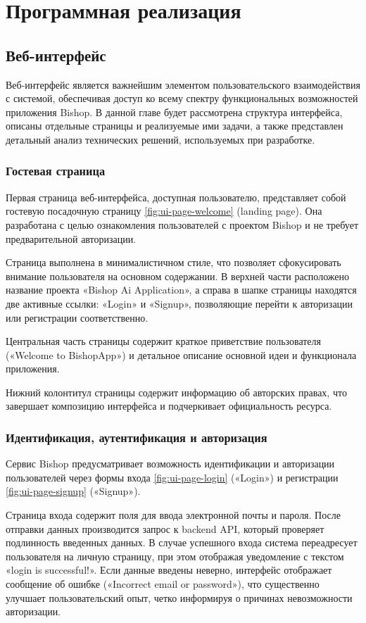 \chapter{Программная реализация}

\section{Веб-интерфейс}
Веб-интерфейс является важнейшим элементом пользовательского взаимодействия с системой, обеспечивая доступ ко всему спектру функциональных возможностей приложения Bishop.
В данной главе будет рассмотрена структура интерфейса, описаны отдельные страницы и реализуемые ими задачи, а также представлен детальный анализ технических решений,
используемых при разработке.

\subsection{Гостевая страница}
Первая страница веб-интерфейса, доступная пользователю, представляет собой гостевую посадочную страницу \ref{fig:ui-page-welcome} (landing page). Она разработана с целью ознакомления пользователей с проектом Bishop и не требует предварительной авторизации.


Страница выполнена в минималистичном стиле, что позволяет сфокусировать внимание пользователя на основном содержании. В верхней части расположено название проекта «Bishop Ai Application», а справа в шапке страницы находятся две активные ссылки: «Login» и «Signup», позволяющие перейти к авторизации или регистрации соответственно.


Центральная часть страницы содержит краткое приветствие пользователя («Welcome to BishopApp») и детальное описание основной идеи и функционала приложения. 


Нижний колонтитул страницы содержит информацию об авторских правах, что завершает композицию интерфейса и подчеркивает официальность ресурса.

\subsection{Идентификация, аутентификация и авторизация}

Сервис Bishop предусматривает возможность идентификации и авторизации пользователей через формы 
входа \ref{fig:ui-page-login} («Login») и регистрации \ref{fig:ui-page-signup} («Signup»).

Страница входа содержит поля для ввода электронной почты и пароля. После отправки данных 
производится запрос к backend API, который проверяет подлинность введенных данных. В случае 
успешного входа система переадресует пользователя на личную страницу, при этом отображая 
уведомление с текстом «login is successful!». Если данные введены неверно, интерфейс 
отображает сообщение об ошибке («Incorrect email or password»), что существенно улучшает 
пользовательский опыт, четко информируя о причинах невозможности авторизации.

